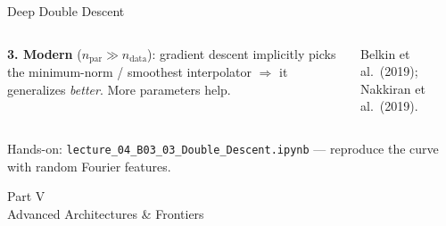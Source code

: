 \documentclass[aspectratio=169,11pt]{beamer}
\newcommand{\emphc}[1]{\textcolor{harvardcrimson}{#1}}
\begin{document}
\begin{frame}{Deep Double Descent}
\begin{columns}[T]
{\vspace{0.06cm}
\textcolor{softgreen}{\textbf{3. Modern}} ($n_\text{par}\!\gg\!n_\text{data}$): gradient descent implicitly picks the \emphc{minimum-norm / smoothest} interpolator $\Rightarrow$ it generalizes \emph{better}. More parameters help.

\vspace{0.08cm}
{\scriptsize Belkin et al.\ (2019); Nakkiran et al.\ (2019).}}
\end{columns}

\vspace{0.05cm}
{\footnotesize\emphc{Hands-on:} \texttt{lecture\_04\_B03\_03\_Double\_Descent.ipynb} --- reproduce the curve with random Fourier features.}
\end{frame}
\begin{frame}{}
\begin{center}
{\Huge \textcolor{uzhblue}{Part V}}\\[0.8em]
{\LARGE Advanced Architectures \& Frontiers}
\end{center}
\end{frame}
\end{document}
